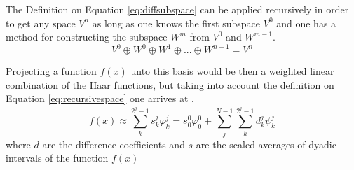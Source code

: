 \documentclass[../master_thesis.tex]{subfiles}
\begin{document}
The Definition on Equation \ref{eq:diffsubspace} can be applied recursively in order to
get any space $V^n$ as long as one knows the first subspace $V^0$ and one has a method for constructing the
subspace $W^m$ from $V^0$ and $W^{m-1}$.
\begin{equation}
    V^0 \oplus W^0 \oplus W^1 \oplus ... \oplus W^{n-1}  = V^n \label{eq:recursivespace}
\end{equation}

Projecting a function $f(x)$ unto this basis would be then a weighted linear combination
of the Haar functions, but taking into account the definition on Equation \ref{eq:recursivespace} one arrives
at \cite{Sorland}.
\begin{equation}\label{eq:projectftohaar}
  f(x)\approx \sum^{2^j -1}_k s^j_k\varphi^j_k = s^0_0\varphi^0_0 + \sum^{N - 1}_j\sum^{2^j -1}_k d^j_k\psi^j_k
\end{equation}
where $d$ are the difference coefficients and $s$ are the scaled averages of dyadic intervals of the function $f(x)$
\end{document}
